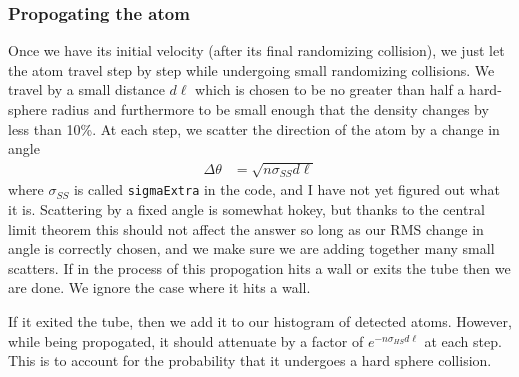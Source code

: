 \documentclass{article}
\begin{document}
\subsubsection{Propogating the atom}
Once we have its initial velocity (after its final randomizing
collision), we just let the atom travel step by step while undergoing
small randomizing collisions.  We travel by a small distance $d\ell$
which is chosen to be no greater than half a hard-sphere radius and
furthermore to be small enough that the density changes by less than
10\%.  At each step, we scatter the direction of the atom by a change
in angle
\begin{align}
  \Delta\theta &= \sqrt{n\sigma_{SS}d\ell}
\end{align}
where $\sigma_{SS}$ is called \verb!sigmaExtra! in the code, and I
have not yet figured out what it is.  Scattering by a fixed angle is
somewhat hokey, but thanks to the central limit theorem
this should not affect the answer so long as our RMS change in angle
is correctly chosen, and we make sure we are adding together many
small scatters.  If in the process of this propogation hits a wall or
exits the tube then we are done.  We ignore the case where it hits a
wall.

If it exited the tube, then we add it to our histogram of detected
atoms.  However, while being propogated, it should attenuate by a
factor of $e^{-n\sigma_{HS}d\ell}$ at each step.  This is to account
for the probability that it undergoes a hard sphere collision.
\end{document}
